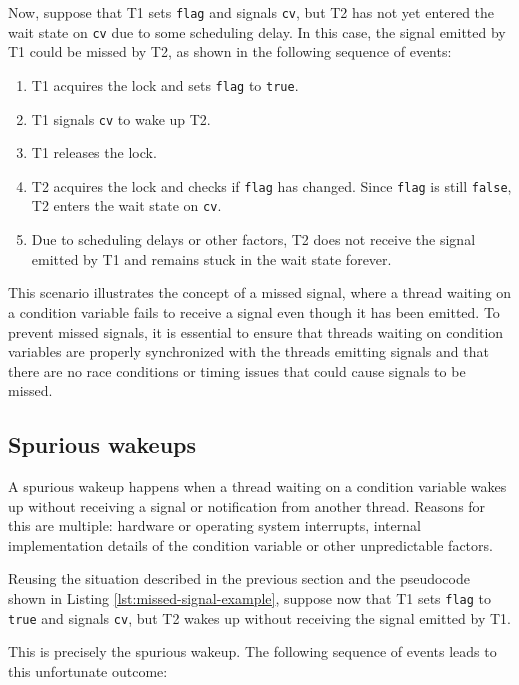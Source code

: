 Now, suppose that T1 sets \texttt{flag} and signals \texttt{cv},
but T2 has not yet entered the wait state on \texttt{cv} due to some scheduling delay.
In this case, the signal emitted by T1 could be missed by T2,
as shown in the following sequence of events:

\begin{enumerate}
      \item T1 acquires the lock and sets \texttt{flag} to \texttt{true}.
      \item T1 signals \texttt{cv} to wake up T2.
      \item T1 releases the lock.
      \item T2 acquires the lock and checks if \texttt{flag} has changed.
            Since \texttt{flag} is still \texttt{false},
            T2 enters the wait state on \texttt{cv}.
      \item Due to scheduling delays or other factors,
            T2 does not receive the signal emitted by T1
            and remains stuck in the wait state forever.
\end{enumerate}

This scenario illustrates the concept of a missed signal,
where a thread waiting on a condition variable fails
to receive a signal even though it has been emitted.
To prevent missed signals, it is essential to ensure that
threads waiting on condition variables are properly synchronized
with the threads emitting signals and
that there are no race conditions or timing issues
that could cause signals to be missed.

\subsection{Spurious wakeups}

A spurious wakeup happens when a thread waiting on a condition variable wakes up
without receiving a signal or notification from another thread.
Reasons for this are multiple: hardware or operating system interrupts,
internal implementation details of the condition variable
or other unpredictable factors.

Reusing the situation described in the previous section and
the pseudocode shown in Listing \ref{lst:missed-signal-example},
suppose now that T1 sets \texttt{flag} to \texttt{true} and signals \texttt{cv},
but T2 wakes up without receiving the signal emitted by T1.

This is precisely the spurious wakeup.
The following sequence of events leads to this unfortunate outcome:

